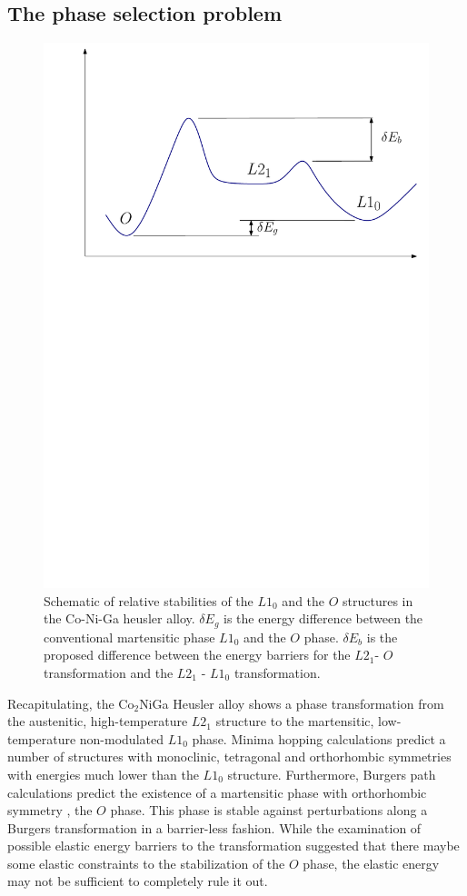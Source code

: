 \documentclass[%
preprint,
 amsmath,amssymb,
 aps,
prb,
showkeys,
]{revtex4-1}
\begin{document}
\subsection{The phase selection problem}
 \begin{figure}[htp!]
  \includegraphics[scale=0.7]{figure_5}
  \caption{Schematic of relative stabilities of  the $L1_0$ and the $O$ structures in the Co-Ni-Ga heusler alloy. $\delta E_g$ is the energy difference between the conventional martensitic phase $L1_0$ and the $O$ phase. $\delta E_b$ is the proposed difference between the energy barriers for the $L2_1$- $ O$ transformation and the  $L2_1$ - $L1_0$ transformation.}
  \label{phase_selection}
\end{figure}
Recapitulating, the Co$_2$NiGa Heusler alloy shows a phase transformation from the austenitic, high-temperature $L2_1$ structure to the martensitic, low-temperature non-modulated $L1_0$ phase.  Minima hopping calculations predict a number of structures with monoclinic, tetragonal and orthorhombic symmetries with energies much lower than the $L1_0$ structure. Furthermore, Burgers path calculations  predict the existence of a martensitic phase with orthorhombic symmetry , the $ O $ phase. This phase is stable against perturbations along a Burgers transformation in a barrier-less fashion. While the examination of possible elastic energy barriers to the transformation suggested that there maybe some elastic constraints to the stabilization of the $O$ phase, the elastic energy may not be sufficient to completely rule it out.  
\end{document}
